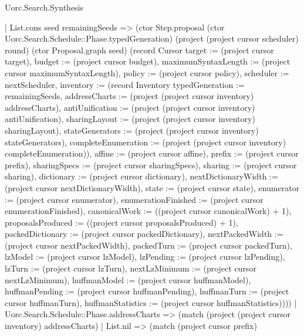\begin{lexlean}{Uorc.Search.Synthesis}
\begin{semanticmodule}
{      | List.cons seed remainingSeeds => (ctor Step.proposal (ctor Uorc.Search.Schedule::Phase.typedGeneration) (project (project cursor scheduler) round) (ctor Proposal.graph seed) (record Cursor {target := (project cursor target), budget := (project cursor budget), maximumSyntaxLength := (project cursor maximumSyntaxLength), policy := (project cursor policy), scheduler := nextScheduler, inventory := (record Inventory {typedGeneration := remainingSeeds, addressCharts := (project (project cursor inventory) addressCharts), antiUnification := (project (project cursor inventory) antiUnification), sharingLayout := (project (project cursor inventory) sharingLayout), stateGenerators := (project (project cursor inventory) stateGenerators), completeEnumeration := (project (project cursor inventory) completeEnumeration)}), affine := (project cursor affine), prefix := (project cursor prefix), sharingSpecs := (project cursor sharingSpecs), sharing := (project cursor sharing), dictionary := (project cursor dictionary), nextDictionaryWidth := (project cursor nextDictionaryWidth), state := (project cursor state), enumerator := (project cursor enumerator), enumerationFinished := (project cursor enumerationFinished), canonicalWork := ((project cursor canonicalWork) + 1), proposalsProduced := ((project cursor proposalsProduced) + 1), packedDictionary := (project cursor packedDictionary), nextPackedWidth := (project cursor nextPackedWidth), packedTurn := (project cursor packedTurn), lzModel := (project cursor lzModel), lzPending := (project cursor lzPending), lzTurn := (project cursor lzTurn), nextLzMinimum := (project cursor nextLzMinimum), huffmanModel := (project cursor huffmanModel), huffmanPending := (project cursor huffmanPending), huffmanTurn := (project cursor huffmanTurn), huffmanStatistics := (project cursor huffmanStatistics)})))
    | Uorc.Search.Schedule::Phase.addressCharts => (match (project (project cursor inventory) addressCharts)
      | List.nil => (match (project cursor prefix)
}
\end{semanticmodule}
\end{lexlean}
